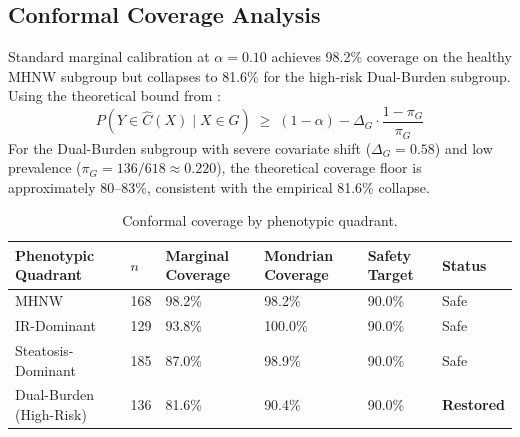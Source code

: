\documentclass[12pt,a4paper,oneside]{report}
\begin{document}
\begin{table}[H]
\centering
\caption{Structural and safety comparison across methods.}
\label{tab:structural_comparison}
\end{table}

\subsection{Conformal Coverage Analysis}

Standard marginal calibration at $\alpha = 0.10$ achieves 98.2\% coverage on the healthy MHNW subgroup but collapses to 81.6\% for the high-risk Dual-Burden subgroup. Using the theoretical bound from \citet{barber2023}:
\[
P(Y \in \hat{C}(X) \mid X \in G) \;\geq\; (1-\alpha) - \Delta_G \cdot \frac{1-\pi_G}{\pi_G}
\]
For the Dual-Burden subgroup with severe covariate shift ($\Delta_G = 0.58$) and low prevalence ($\pi_G = 136/618 \approx 0.220$), the theoretical coverage floor is approximately 80--83\%, consistent with the empirical 81.6\% collapse.

\begin{table}[H]
\centering
\caption{Conformal coverage by phenotypic quadrant.}
\label{tab:conformal_coverage}
\begin{tabular}{@{}llllll@{}}
\toprule
\textbf{Phenotypic Quadrant} & \textbf{$n$} & \textbf{Marginal Coverage} & \textbf{Mondrian Coverage} & \textbf{Safety Target} & \textbf{Status} \\ \midrule
MHNW                          & 168 & 98.2\% & 98.2\%  & 90.0\% & Safe \\
IR-Dominant                   & 129 & 93.8\% & 100.0\% & 90.0\% & Safe \\
Steatosis-Dominant            & 185 & 87.0\% & 98.9\%  & 90.0\% & Safe \\
Dual-Burden (High-Risk)       & 136 & 81.6\% & 90.4\%  & 90.0\% & \textbf{Restored} \\ \bottomrule
\end{tabular}
\end{table}
\end{document}
